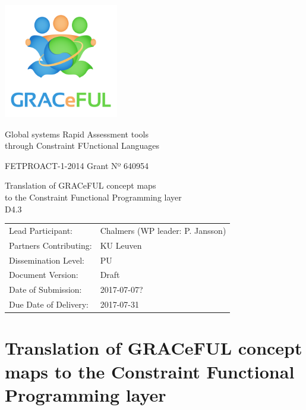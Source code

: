 \documentclass{article}
\author{}
\date{}
\begin{document}
\begin{center}
\includegraphics[width=5cm]{../coverpage/GRACeFULlogo.png}

\textcolor{GRACeFULblue}{Global systems Rapid Assessment tools\\
through Constraint FUnctional Languages}

\vspace{1cm}

FETPROACT-1-2014 Grant Nº 640954

\end{center}

\begin{framed}
\begin{center}
\Large
Translation of GRACeFUL concept maps\\
to the Constraint Functional Programming layer\\[1ex]

D4.3\\[1ex]

\end{center}
\end{framed}

\vspace{1cm}

\noindent
\begin{tabular}{@{}ll@{}}
  Lead Participant:       & Chalmers (WP leader: P. Jansson)
\\Partners Contributing:  & KU Leuven
\\Dissemination Level:    & PU
\\Document Version:       & Draft
\\Date of Submission:     & 2017-07-07?
\\Due Date of Delivery:   & 2017-07-31
\end{tabular}

\newpage

\section*{Translation of GRACeFUL concept maps to the Constraint Functional Programming layer}\label{DSL4GRACeFUL}
\end{document}
